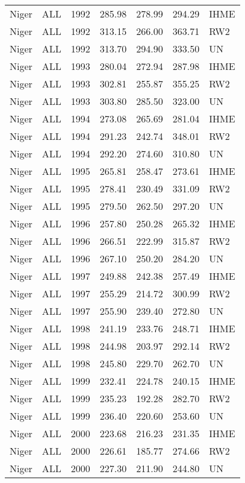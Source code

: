\begin{longtable}{lllrrrl}
  Niger & ALL & 1992 & 285.98 & 278.99 & 294.29 & IHME \\ 
  Niger & ALL & 1992 & 313.15 & 266.00 & 363.71 & RW2 \\ 
  Niger & ALL & 1992 & 313.70 & 294.90 & 333.50 & UN \\ 
  Niger & ALL & 1993 & 280.04 & 272.94 & 287.98 & IHME \\ 
  Niger & ALL & 1993 & 302.81 & 255.87 & 355.25 & RW2 \\ 
  Niger & ALL & 1993 & 303.80 & 285.50 & 323.00 & UN \\ 
  Niger & ALL & 1994 & 273.08 & 265.69 & 281.04 & IHME \\ 
  Niger & ALL & 1994 & 291.23 & 242.74 & 348.01 & RW2 \\ 
  Niger & ALL & 1994 & 292.20 & 274.60 & 310.80 & UN \\ 
  Niger & ALL & 1995 & 265.81 & 258.47 & 273.61 & IHME \\ 
  Niger & ALL & 1995 & 278.41 & 230.49 & 331.09 & RW2 \\ 
  Niger & ALL & 1995 & 279.50 & 262.50 & 297.20 & UN \\ 
  Niger & ALL & 1996 & 257.80 & 250.28 & 265.32 & IHME \\ 
  Niger & ALL & 1996 & 266.51 & 222.99 & 315.87 & RW2 \\ 
  Niger & ALL & 1996 & 267.10 & 250.20 & 284.20 & UN \\ 
  Niger & ALL & 1997 & 249.88 & 242.38 & 257.49 & IHME \\ 
  Niger & ALL & 1997 & 255.29 & 214.72 & 300.99 & RW2 \\ 
  Niger & ALL & 1997 & 255.90 & 239.40 & 272.80 & UN \\ 
  Niger & ALL & 1998 & 241.19 & 233.76 & 248.71 & IHME \\ 
  Niger & ALL & 1998 & 244.98 & 203.97 & 292.14 & RW2 \\ 
  Niger & ALL & 1998 & 245.80 & 229.70 & 262.70 & UN \\ 
  Niger & ALL & 1999 & 232.41 & 224.78 & 240.15 & IHME \\ 
  Niger & ALL & 1999 & 235.23 & 192.28 & 282.70 & RW2 \\ 
  Niger & ALL & 1999 & 236.40 & 220.60 & 253.60 & UN \\ 
  Niger & ALL & 2000 & 223.68 & 216.23 & 231.35 & IHME \\ 
  Niger & ALL & 2000 & 226.61 & 185.77 & 274.66 & RW2 \\ 
  Niger & ALL & 2000 & 227.30 & 211.90 & 244.80 & UN \\ 

\end{longtable}
